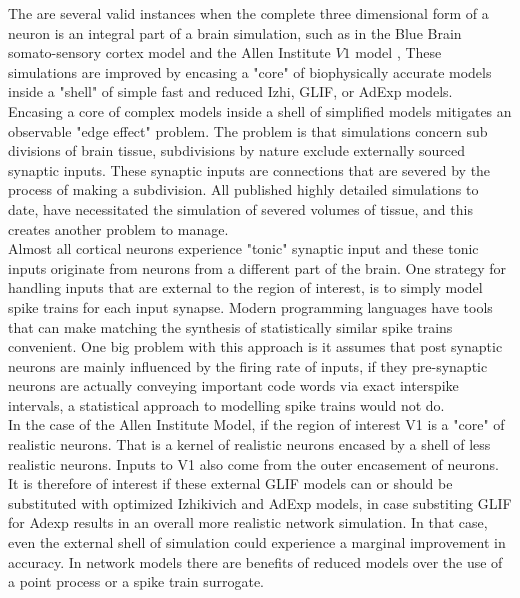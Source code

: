The are several valid instances when the complete three dimensional form of a neuron is an integral part of a brain simulation, such as in the Blue Brain somato-sensory cortex model \cite{markram2006blue} and the Allen Institute $V1$ model \cite{billeh2020systematic}, These simulations are improved by encasing a "core" of biophysically accurate models inside a "shell" of simple fast and reduced Izhi, GLIF, or AdExp models.\\ 
Encasing a core of complex models inside a shell of simplified models mitigates an observable "edge effect" problem. The problem is that simulations concern sub divisions of brain tissue, subdivisions by nature exclude externally sourced synaptic inputs. These synaptic inputs are connections that are severed by the process of making a subdivision. All published highly detailed simulations to date, have necessitated the simulation of severed volumes of tissue, and this creates another problem to manage.\\
Almost all cortical neurons experience "tonic" synaptic input and these tonic inputs originate from neurons from a different part of the brain. One strategy for handling inputs that are external to the region of interest, is to simply model spike trains for each input synapse. Modern programming languages have tools that can make matching the synthesis of statistically similar spike trains convenient. One big problem with this approach is it assumes that post synaptic neurons are mainly influenced by the firing rate of inputs, if they pre-synaptic neurons are actually conveying important code words via exact interspike intervals, a statistical approach to modelling spike trains would not do.\\

In the case of the Allen Institute Model, if the region of interest V1 is a "core" of realistic neurons. That is a kernel of realistic neurons encased by a shell of less realistic neurons. Inputs to V1 also come from the outer encasement of neurons. It is therefore of interest if these external GLIF models can or should be substituted with optimized Izhikivich and AdExp models, in case substiting GLIF for Adexp results in an overall more realistic network simulation. In that case, even the external shell of simulation could experience a marginal improvement in accuracy. In network models there are benefits of reduced models over the use of a point process or a spike train surrogate.\\

